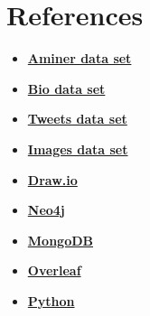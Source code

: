 \documentclass{Configuration_Files/PoliMi3i_thesis}
\begin{document}
\chapter{References}
\label{ch:references}
\begin{itemize}
    \item \textbf{\href{https://www.aminer.org/citation}{Aminer data set}}
    \item \textbf{\href{https://www.kaggle.com/datasets/choobani/goodread-authors}{Bio data set}}
    \item \textbf{\href{https://transparency.twitter.com/en/reports/moderation-research.html}{Tweets data set}}
    \item \textbf{\href{https://huggingface.co/datasets/conceptual_captions/commit/0477f735cc48e10c43ef55b9b2ca67fce3d45314\#d2h-548657}{Images data set}}
    \item \textbf{\href{https://app.diagrams.net/}{Draw.io}}
    \item \textbf{\href{https://neo4j.com/}{Neo4j}}
    \item \textbf{\href{https://www.mongodb.com/}{MongoDB}}
    \item \textbf{\href{https://www.overleaf.com/}{Overleaf}}
    \item \textbf{\href{https://www.python.org/}{Python}}
\end{itemize}
\end{document}
